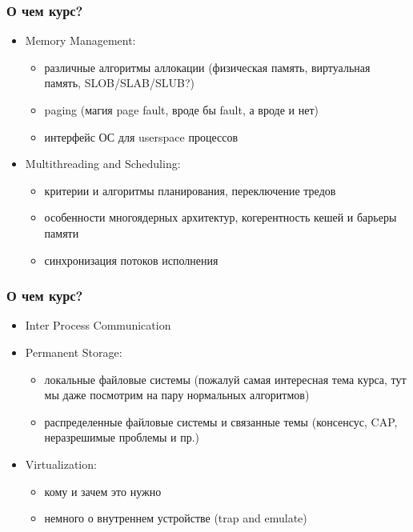 \begin{frame}
\frametitle{О чем курс?}

\begin{itemize}
  \item<1-> Memory Management:

    \begin{itemize}
      \item различные алгоритмы аллокации (физическая память, виртуальная
            память, SLOB/SLAB/SLUB?)
      \item paging (магия page fault, вроде бы fault, а вроде и нет)
      \item интерфейс ОС для userspace процессов
    \end{itemize}

  \item<2> Multithreading and Scheduling:
    \begin{itemize}
      \item критерии и алгоритмы планирования, переключение тредов
      \item особенности многоядерных архитектур, когерентность кешей и барьеры
            памяти
      \item синхронизация потоков исполнения
    \end{itemize}
\end{itemize}

\end{frame}

\begin{frame}
\frametitle{О чем курс?}

\begin{itemize}
  \item<1-> Inter Process Communication

  \item<2-> Permanent Storage:
    \begin{itemize}
      \item локальные файловые системы (пожалуй самая интересная тема курса, тут
            мы даже посмотрим на пару нормальных алгоритмов)
      \item распределенные файловые системы и связанные темы (консенсус, CAP,
            неразрешимые проблемы и пр.)
    \end{itemize}

  \item<3> Virtualization:
    \begin{itemize}
      \item кому и зачем это нужно
      \item немного о внутреннем устройстве (trap and emulate)
    \end{itemize}

\end{itemize}

\end{frame}
